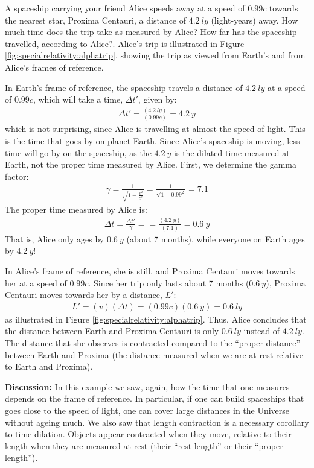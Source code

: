 \begin{example}{\label{ex:specialrelativity:alphatrip}A spaceship carrying your friend Alice speeds away at a speed of $0.99c$ towards the nearest star, Proxima Centauri, a distance of $\SI{4.2}{ly}$ (light-years) away. How much time does the trip take as measured by Alice? How far has the spaceship travelled, according to Alice?.}
Alice's trip is illustrated in Figure \ref{fig:specialrelativity:alphatrip}, showing the trip as viewed from Earth's and from Alice's frames of reference.

In Earth's frame of reference, the spaceship travels a distance of $\SI{4.2}{ly}$ at a speed of $0.99c$, which will take a time, $\Delta t'$, given by:
\begin{align*}
\Delta t' = \frac{(\SI{4.2}{ly})}{(0.99c)}=\SI{4.2}{y}
\end{align*}
which is not surprising, since Alice is travelling at almost the speed of light. This is the time that goes by on planet Earth. Since Alice's spaceship is moving, less time will go by on the spaceship, as the $\SI{4.2}{y}$ is the dilated time measured at Earth, not the proper time measured by Alice. First, we determine the gamma factor:
\begin{align*}
\gamma = \frac{1}{\sqrt{1-\frac{v^2}{c^2}}} =\frac{1}{\sqrt{1-0.99^2}}=7.1
\end{align*}
The proper time measured by Alice is:
\begin{align*}
\Delta t = \frac{\Delta t'}{\gamma}==\frac{(\SI{4.2}{y})}{(7.1)}=\SI{0.6}{y}
\end{align*}
That is, Alice only ages by $\SI{0.6}{y}$ (about 7 months), while everyone on Earth ages by $\SI{4.2}{y}$!

In Alice's frame of reference, she is still, and Proxima Centauri moves towards her at a speed of $0.99c$. Since her trip only lasts about 7 months ($\SI{0.6}{y}$), Proxima Centauri moves towards her by a distance, $L'$:
\begin{align*}
L'=(v)(\Delta t)=(0.99c)(\SI{0.6}{y})=\SI{0.6}{ly}
\end{align*}
as illustrated in Figure \ref{fig:specialrelativity:alphatrip}. Thus, Alice concludes that the distance between Earth and Proxima Centauri is only $\SI{0.6}{ly}$ instead of $\SI{4.2}{ly}$. The distance that she observes is contracted compared to the ``proper distance'' between Earth and Proxima (the distance measured when we are at rest relative to Earth and Proxima).

\textbf{Discussion: }In this example we saw, again, how the time that one measures depends on the frame of reference. In particular, if one can build spaceships that goes close to the speed of light, one can cover large distances in the Universe without ageing much. We also saw that length contraction is a necessary corollary to time-dilation. Objects appear contracted when they move, relative to their length when they are measured at rest (their ``rest length'' or their ``proper length'').
\end{example}
